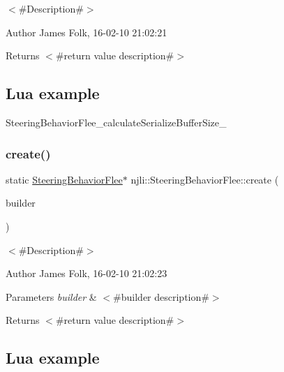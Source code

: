 $<$\#\+Description\#$>$ 

\begin{DoxyAuthor}{Author}
James Folk, 16-\/02-\/10 21\+:02\+:21
\end{DoxyAuthor}
\begin{DoxyReturn}{Returns}
$<$\#return value description\#$>$
\end{DoxyReturn}
\hypertarget{classnjli_1_1_steering_behavior_wander_ex1}{}\subsection{Lua example}\label{classnjli_1_1_steering_behavior_wander_ex1}

\begin{DoxyCodeInclude}
\end{DoxyCodeInclude}
Steering\+Behavior\+Flee\+\_\+calculate\+Serialize\+Buffer\+Size\+\_\+ \mbox{\label{classnjli_1_1_steering_behavior_flee_aee8887a111ab2c8a08c6d31e42e8dbdb}} 
\subsubsection{\texorpdfstring{create()}{create()}\hspace{0.1cm}{\footnotesize\ttfamily [2/2]}}
{\footnotesize\ttfamily static \mbox{\hyperlink{classnjli_1_1_steering_behavior_flee}{Steering\+Behavior\+Flee}}$\ast$ njli\+::\+Steering\+Behavior\+Flee\+::create (\begin{DoxyParamCaption}\item[{const \mbox{\hyperlink{classnjli_1_1_steering_behavior_flee_builder}{Steering\+Behavior\+Flee\+Builder}} \&}]{builder }\end{DoxyParamCaption})\hspace{0.3cm}{\ttfamily [static]}}



$<$\#\+Description\#$>$ 

\begin{DoxyAuthor}{Author}
James Folk, 16-\/02-\/10 21\+:02\+:23
\end{DoxyAuthor}

\begin{DoxyParams}{Parameters}
{\em builder} & $<$\#builder description\#$>$\\
\hline
\end{DoxyParams}
\begin{DoxyReturn}{Returns}
$<$\#return value description\#$>$
\end{DoxyReturn}
\hypertarget{classnjli_1_1_steering_behavior_wander_ex1}{}\subsection{Lua example}\label{classnjli_1_1_steering_behavior_wander_ex1}

